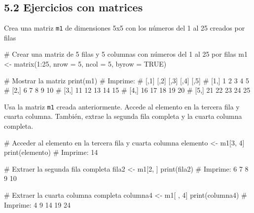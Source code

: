 \documentclass[
  letterpaper,
]{scrbook}
\newenvironment{Shaded}{\begin{snugshade}}{\end{snugshade}}
\newcommand{\AttributeTok}[1]{\textcolor[rgb]{0.40,0.45,0.13}{#1}}
\newcommand{\CommentTok}[1]{\textcolor[rgb]{0.37,0.37,0.37}{#1}}
\newcommand{\ConstantTok}[1]{\textcolor[rgb]{0.56,0.35,0.01}{#1}}
\newcommand{\DecValTok}[1]{\textcolor[rgb]{0.68,0.00,0.00}{#1}}
\newcommand{\FunctionTok}[1]{\textcolor[rgb]{0.28,0.35,0.67}{#1}}
\newcommand{\NormalTok}[1]{\textcolor[rgb]{0.00,0.23,0.31}{#1}}
\newcommand{\OtherTok}[1]{\textcolor[rgb]{0.00,0.23,0.31}{#1}}
\newcommand{\SpecialCharTok}[1]{\textcolor[rgb]{0.37,0.37,0.37}{#1}}
\begin{document}
\hypertarget{ejercicios-con-matrices}{%
\subsection{5.2 Ejercicios con matrices}\label{ejercicios-con-matrices}}

Crea una matriz \texttt{m1} de dimensiones 5x5 con los números del 1 al
25 creados por filas

\begin{Shaded}
\begin{Highlighting}[]
\CommentTok{\# Crear una matriz de 5 filas y 5 columnas con números del 1 al 25 por filas}
\NormalTok{m1 }\OtherTok{\textless{}{-}} \FunctionTok{matrix}\NormalTok{(}\DecValTok{1}\SpecialCharTok{:}\DecValTok{25}\NormalTok{, }\AttributeTok{nrow =} \DecValTok{5}\NormalTok{, }\AttributeTok{ncol =} \DecValTok{5}\NormalTok{, }\AttributeTok{byrow =} \ConstantTok{TRUE}\NormalTok{)}

\CommentTok{\# Mostrar la matriz}
\FunctionTok{print}\NormalTok{(m1)}
\CommentTok{\# Imprime:}
\CommentTok{\#      [,1] [,2] [,3] [,4] [,5]}
\CommentTok{\# [1,]    1    2    3    4    5}
\CommentTok{\# [2,]    6    7    8    9   10}
\CommentTok{\# [3,]   11   12   13   14   15}
\CommentTok{\# [4,]   16   17   18   19   20}
\CommentTok{\# [5,]   21   22   23   24   25}
\end{Highlighting}
\end{Shaded}

Usa la matriz \texttt{m1} creada anteriormente. Accede al elemento en la
tercera fila y cuarta columna. También, extrae la segunda fila completa
y la cuarta columna completa.

\begin{Shaded}
\begin{Highlighting}[]
\CommentTok{\# Acceder al elemento en la tercera fila y cuarta columna}
\NormalTok{elemento }\OtherTok{\textless{}{-}}\NormalTok{ m1[}\DecValTok{3}\NormalTok{, }\DecValTok{4}\NormalTok{]}
\FunctionTok{print}\NormalTok{(elemento)}
\CommentTok{\# Imprime: 14}

\CommentTok{\# Extraer la segunda fila completa}
\NormalTok{fila2 }\OtherTok{\textless{}{-}}\NormalTok{ m1[}\DecValTok{2}\NormalTok{, ]}
\FunctionTok{print}\NormalTok{(fila2)}
\CommentTok{\# Imprime: 6 7 8 9 10}

\CommentTok{\# Extraer la cuarta columna completa}
\NormalTok{columna4 }\OtherTok{\textless{}{-}}\NormalTok{ m1[ , }\DecValTok{4}\NormalTok{]}
\FunctionTok{print}\NormalTok{(columna4)}
\CommentTok{\# Imprime: 4 9 14 19 24}
\end{Highlighting}
\end{Shaded}
\end{document}
